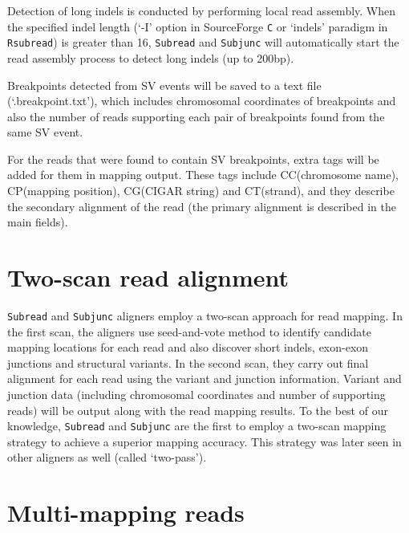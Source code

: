 \documentclass[12pt]{report}
\newcommand{\code}[1]{{\small\texttt{#1}}}
\begin{document}
Detection of long indels is conducted by performing local read assembly.
When the specified indel length (`-I' option in SourceForge \code{C} or `indels' paradigm in \code{Rsubread}) is greater than 16, \code{Subread} and \code{Subjunc} will automatically start the read assembly process to detect long indels (up to 200bp).

Breakpoints detected from SV events will be saved to a text file (`.breakpoint.txt'), which includes chromosomal coordinates of breakpoints and also the number of reads supporting each pair of breakpoints found from the same SV event.

For the reads that were found to contain SV breakpoints, extra tags will be added for them in mapping output.
These tags include CC(chromosome name), CP(mapping position), CG(CIGAR string) and CT(strand), and they describe the secondary alignment of the read (the primary alignment is described in the main fields).


\section{Two-scan read alignment}

\code{Subread} and \code{Subjunc} aligners employ a two-scan approach for read mapping.
In the first scan, the aligners use seed-and-vote method to identify candidate mapping locations for each read and also discover short indels, exon-exon junctions and structural variants.
In the second scan, they carry out final alignment for each read using the variant and junction information.
Variant and junction data (including chromosomal coordinates and number of supporting reads) will be output along with the read mapping results.
To the best of our knowledge, \code{Subread} and \code{Subjunc} are the first to employ a two-scan mapping strategy to achieve a superior mapping accuracy.
This strategy was later seen in other aligners as well (called `two-pass').


\section{Multi-mapping reads}
\end{document}
